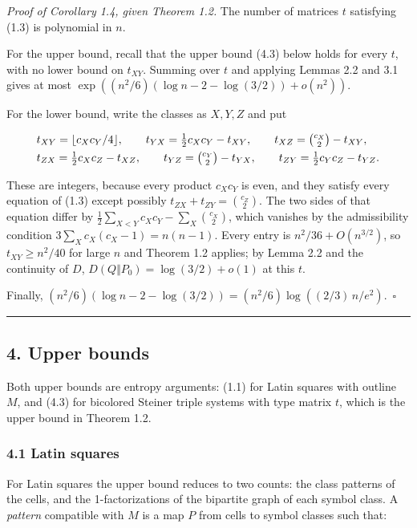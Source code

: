 \documentclass[english,11pt,a4paper]{article}
\begin{document}
\emph{Proof of Corollary 1.4, given Theorem 1.2.} The number of matrices \(t\) satisfying (1.3) is polynomial in \(n\).

For the upper bound, recall that the upper bound (4.3) below holds for every \(t\), with no lower bound on \(t_{XY}\). Summing over \(t\) and applying Lemmas 2.2 and 3.1 gives at most \(\exp((n^2/6)(\log n-2-\log(3/2))+o(n^2))\).

For the lower bound, write the classes as \(X,Y,Z\) and put

\nopagebreak[4]
\[\begin{aligned}
&t_{XY}=\lfloor c_Xc_Y/4\rfloor,\qquad t_{YX}=\tfrac12c_Xc_Y-t_{XY},\qquad t_{XZ}=\tbinom{c_X}{2}-t_{XY},\\
&t_{ZX}=\tfrac12c_Xc_Z-t_{XZ},\qquad t_{YZ}=\tbinom{c_Y}{2}-t_{YX},\qquad t_{ZY}=\tfrac12c_Yc_Z-t_{YZ}.
\end{aligned}\]

These are integers, because every product \(c_Xc_Y\) is even, and they satisfy every equation of (1.3) except possibly \(t_{ZX}+t_{ZY}=\binom{c_Z}{2}\). The two sides of that equation differ by \(\frac12\sum_{X<Y}c_Xc_Y-\sum_X\binom{c_X}{2}\), which vanishes by the admissibility condition \(3\sum_Xc_X(c_X-1)=n(n-1)\). Every entry is \(n^2/36+O(n^{3/2})\), so \(t_{XY}\ge n^2/40\) for large \(n\) and Theorem 1.2 applies; by Lemma 2.2 and the continuity of \(D\), \(D(Q\Vert P_0)=\log(3/2)+o(1)\) at this \(t\).

Finally, \((n^2/6)(\log n-2-\log(3/2))=(n^2/6)\log((2/3)\,n/e^2)\).~\(\square\)

\begin{center}\rule{0.5\linewidth}{0.5pt}\end{center}

\subsection{4. Upper bounds}\label{upper-bounds}

Both upper bounds are entropy arguments: (1.1) for Latin squares with outline \(M\), and (4.3) for bicolored Steiner triple systems with type matrix \(t\), which is the upper bound in Theorem 1.2.

\subsubsection{4.1 Latin squares}\label{latin-squares}

For Latin squares the upper bound reduces to two counts: the class patterns of the cells, and the 1-factorizations of the bipartite graph of each symbol class. A \emph{pattern} compatible with \(M\) is a map \(P\) from cells to symbol classes such that:
\end{document}
